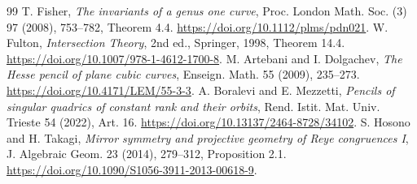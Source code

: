 \documentclass[11pt,a4paper]{ltjsarticle}
\begin{document}
\begin{thebibliography}{99}
 T. Fisher, \emph{The invariants of a genus one curve}, Proc. London Math. Soc. (3) 97 (2008), 753--782, Theorem 4.4. \url{https://doi.org/10.1112/plms/pdn021}.
 W. Fulton, \emph{Intersection Theory}, 2nd ed., Springer, 1998, Theorem 14.4. \url{https://doi.org/10.1007/978-1-4612-1700-8}.
 M. Artebani and I. Dolgachev, \emph{The Hesse pencil of plane cubic curves}, Enseign. Math. 55 (2009), 235--273. \url{https://doi.org/10.4171/LEM/55-3-3}.
 A. Boralevi and E. Mezzetti, \emph{Pencils of singular quadrics of constant rank and their orbits}, Rend. Istit. Mat. Univ. Trieste 54 (2022), Art. 16. \url{https://doi.org/10.13137/2464-8728/34102}.
 S. Hosono and H. Takagi, \emph{Mirror symmetry and projective geometry of Reye congruences I}, J. Algebraic Geom. 23 (2014), 279--312, Proposition 2.1. \url{https://doi.org/10.1090/S1056-3911-2013-00618-9}.
\end{thebibliography}
\end{document}
